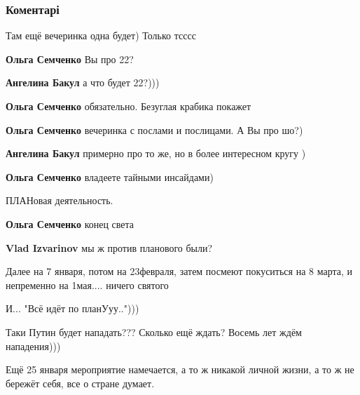  
 
 
 
 
\subsubsection{Коментарі}
\label{sec:27_11_2021.fb.lesev_igor.1.plan_dekjabrj_ukraina.cmt}

\begin{itemize} %
Там ещё вечеринка одна будет)
Только тсссс

\begin{itemize} %
\textbf{Ольга Семченко} Вы про 22?

\textbf{Ангелина Бакул} а что будет 22?)))


\textbf{Ольга Семченко} обязательно. Безуглая крабика покажет

\textbf{Ольга Семченко} вечеринка с послами и послицами. А Вы про шо?)

\textbf{Ангелина Бакул} примерно про то же, но в более интересном кругу )

\textbf{Ольга Семченко} владеете тайными инсайдами)

ПЛАНовая деятельность.

\textbf{Ольга Семченко} конец света

\textbf{Vlad Izvarinov} мы ж против планового были?
\end{itemize} %

Далее на 7 января, потом на 23февраля, затем посмеют покуситься на 8 марта, и непременно на 1мая.... ничего святого

И... "Всё идёт по планУуу..")))

Таки Путин будет нападать??? Сколько ещё ждать? Восемь лет ждём нападения)))

Ещё 25 января мероприятие намечается, а то ж никакой личной жизни, а то ж не бережёт себя, все о стране думает.


\end{itemize}
